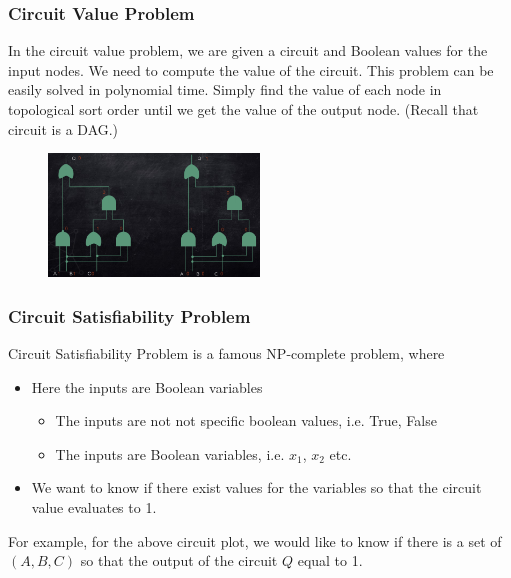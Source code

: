 \subsubsection{Circuit Value Problem}
In the circuit value problem, we are given a circuit and Boolean values for the input nodes. We need to compute the value of the circuit. This problem can be easily solved in polynomial time. Simply find the value of each node in topological sort order until we get the value of the output node. (Recall that circuit is a DAG.)
\begin{figure}[H]
	\centering
	\includegraphics[width=0.5\textwidth]{fig/bool-logic.png}
\end{figure}
\subsubsection{Circuit Satisfiability Problem}
Circuit Satisfiability Problem is a famous NP-complete problem, where
\begin{itemize}
	\item Here the inputs are Boolean variables
	\begin{itemize}
		\item The inputs are not not specific boolean values, i.e. True, False
		\item The inputs are Boolean variables, i.e. $x_1$, $x_2$ etc.
	\end{itemize}
	\item We want to know if there exist values for the variables so that the circuit value evaluates to 1.
\end{itemize}

For example, for the above circuit plot, we would like to know if there is a set of $(A, B, C)$ so that the output of the circuit $Q$ equal to 1.